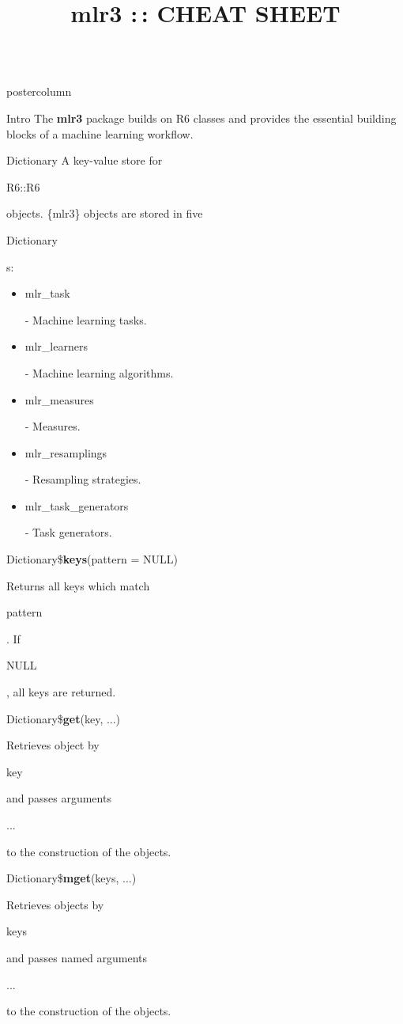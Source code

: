 \documentclass{beamer}
\title{mlr3 :\,: CHEAT SHEET} %
\newlength{\columnheight} %
\newcommand{\codeinline}[1]{\begin{codeboxinline}#1\end{codeboxinline}}
\begin{document}
\begin{frame}[fragile]{}
	\begin{columns}
		\begin{column}{.245\textwidth}
			\begin{beamercolorbox}[center]{postercolumn}
				\begin{minipage}{.98\textwidth}
					\parbox[t][\columnheight]{\textwidth}{
						\begin{myblock}{Intro}
							The \textbf{mlr3} package builds on R6 classes and provides the essential building
							blocks of a machine learning workflow.
						\end{myblock}
						\begin{myblock}{Dictionary}
							A key-value store for \codeinline{R6::R6} objects. 
							\{mlr3\} objects are stored in five \codeinline{Dictionary}s: \\
							\begin{itemize}
								\item \codeinline{mlr\_task} - Machine learning tasks.
								\item \codeinline{mlr\_learners} - Machine learning algorithms.
								\item \codeinline{mlr\_measures} - Measures.
								\item \codeinline{mlr\_resamplings} - Resampling strategies.
								\item \codeinline{mlr\_task\_generators} - Task generators.
							\end{itemize}
							\vspace{1em}		
							\begin{codebox}
								Dictionary\$\textbf{keys}(pattern = NULL)
							\end{codebox}
							Returns all keys which match \codeinline{pattern}. 
							If \codeinline{NULL}, all keys are returned. 
							\\
							\begin{codebox}
								Dictionary\$\textbf{get}(key, ...)
							\end{codebox}
							Retrieves object by \codeinline{key} and 
							passes arguments \codeinline{...} to the construction of the objects.\\
							\begin{codebox}
								Dictionary\$\textbf{mget}(keys, ...)
							\end{codebox}
							Retrieves objects by \codeinline{keys} and 
							passes named arguments \codeinline{...} to the construction of the objects. 
						\end{myblock}
}
\end{minipage}
\end{beamercolorbox}
\end{column}
\end{columns}
\end{frame}
\end{document}
